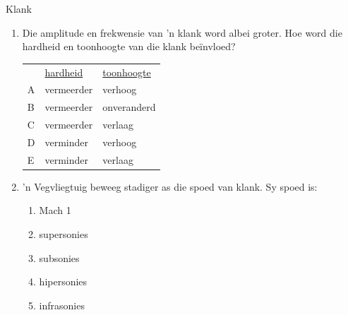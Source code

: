 \begin{eocexercises}{Klank}
\begin{enumerate}[noitemsep, label=\textbf{\arabic*}. ]
\item Die amplitude en frekwensie van  'n klank word albei groter. Hoe word die hardheid en toonhoogte van die klank be\"invloed?
          \begin{table}[H]
        \begin{center}
      \label{m38800*id186726}
    \noindent
      \tablelasttail{}
      \begin{xtabular}[t]{|l|l|l|}\hline
         &
        \uline{hardheid} &
        \uline{toonhoogte}%
     \tabularnewline{}
        A &
        vermeerder &
        verhoog%
     \tabularnewline{}
        B &
        vermeerder &
        onveranderd%
     \tabularnewline{}
        C &
        vermeerder &
        verlaag%
     \tabularnewline{}
        D &
        verminder &
        verhoog%
     \tabularnewline{}
        E &
        verminder &
        verlaag%
     \tabularnewline{}
    \end{xtabular}
      \end{center}
\end{table}
    \par

\item  'n Vegvliegtuig beweeg stadiger as die spoed van klank. Sy spoed is:
\begin{enumerate}[noitemsep, label=\textbf{\alph*}. ] 
\item Mach 1
\item supersonies
\item subsonies
\item hipersonies
\item infrasonies
\end{enumerate}
                

\end{enumerate}
\end{eocexercises}
